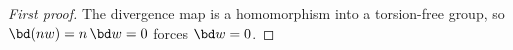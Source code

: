 \begin{proof}[First proof]
The divergence map is a homomorphism into a torsion-free group, so $\bd(n w) = n \, \bd w = 0$ forces $\bd w = 0$.
\end{proof}